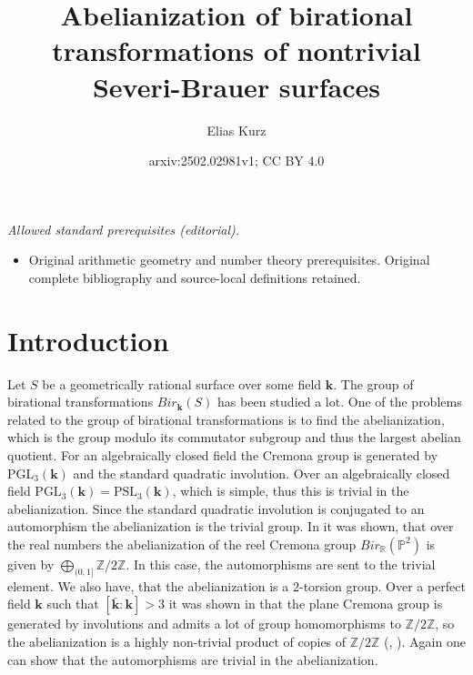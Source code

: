 \documentclass[12pt, oneside, reqno]{amsart}
\title{Abelianization of birational transformations of nontrivial Severi-Brauer surfaces}
\author{Elias Kurz}
\date{arxiv:2502.02981v1; CC BY 4.0}
\begin{document}
\maketitle
\noindent\textit{Allowed standard prerequisites (editorial).}\begin{itemize}
\item Original arithmetic geometry and number theory prerequisites. Original complete bibliography and source-local definitions retained.
\end{itemize}\medskip
\section{Introduction}
\noindent
Let $S$ be a geometrically rational surface over some field $\textbf{k}$. The group of birational transformations $Bir_{\textbf{k}}(S)$ has been studied a lot. One of the problems related to the group of birational transformations is to find the abelianization, which is the group modulo its commutator subgroup and thus the largest abelian quotient. For an algebraically closed field the Cremona group is generated by $\textrm{PGL}_3(\textbf{k})$ and the standard quadratic involution. Over an algebraically closed field $\textrm{PGL}_3(\textbf{k}) = \textrm{PSL}_3(\textbf{k})$, which is simple, thus this is trivial in the abelianization. Since the standard quadratic involution is conjugated to an automorphism the abelianization is the trivial group. In \cite{Zimmermann_2018} it was shown, that over the real numbers the abelianization of the reel Cremona group $Bir_{\mathbb{R}}(\mathbb{P}^2)$ is given by $\bigoplus_{(0,1]} \mathbb{Z}/2\mathbb{Z}$. In this case, the automorphisms are sent to the trivial element. We also have, that the abelianization is a $2$-torsion group. Over a perfect field $\textbf{k}$ such that $[\bar{\textbf{k}}:\textbf{k}] > 3$ it was shown in \cite{LamySchneider_2024} that the plane Cremona group is generated by involutions and admits a lot of group homomorphisms to $\mathbb{Z} / 2 \mathbb{Z}$, so the abelianization is a highly non-trivial product of copies of $\mathbb{Z}/2 \mathbb{Z}$ (\cite{Lamy_2020}, \cite{LamySchneider_2024}). Again one can show that the automorphisms are trivial in the abelianization.
\end{document}
